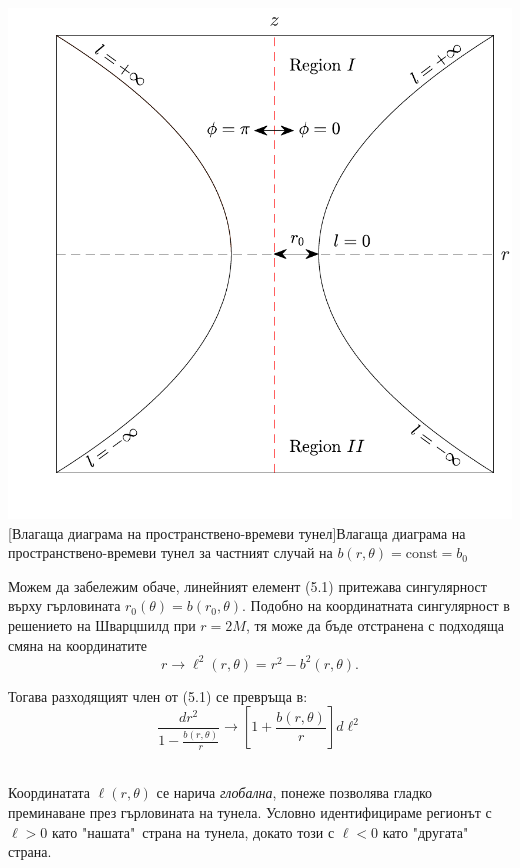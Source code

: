\begin{minipage}{15em}
	\centering
	\hspace{-0.99cm}
	\includegraphics[scale = 0.4]{WH_embedding.pdf}
	[Влагаща диаграма на пространствено-времеви тунел]{\small Влагаща диаграма на пространствено-времеви тунел за частният случай на $b(r,\theta) = \text{const} = b_0$}
	\label{WH_embedding}
\end{minipage}
\begin{minipage}{16em}
	Можем да забележим обаче, линейният елемент (5.1) притежава сингулярност върху гърловината $r_0(\theta) = b(r_0,\theta)$. Подобно на координатната сингулярност в решението на Шварцшилд при $r = 2M$, тя може да бъде отстранена с подходяща смяна на координатите 
	\begin{equation}
	r	 \rightarrow \ell^2(r,\theta) = r^2 - b^2(r,\theta).
	\end{equation}
	
	Тогава разходящият член от (5.1) се превръща в:
	\begin{equation}
		\frac{dr^2}{1 - \frac{b(r,\theta)}{r}} \rightarrow \left[1 + \frac{b(r,\theta)}{r}\right]d\ell^2
	\end{equation}
	
\end{minipage}\\\newline
Координатата $\ell(r,\theta)$ се нарича \emph{глобална}, понеже позволява гладко преминаване през гърловината на тунела. Условно идентифицираме регионът с $\ell >0$ като "нашата"$\,$ страна на тунела, докато този с $\ell < 0$ като "другата"$\,$ страна.\\

